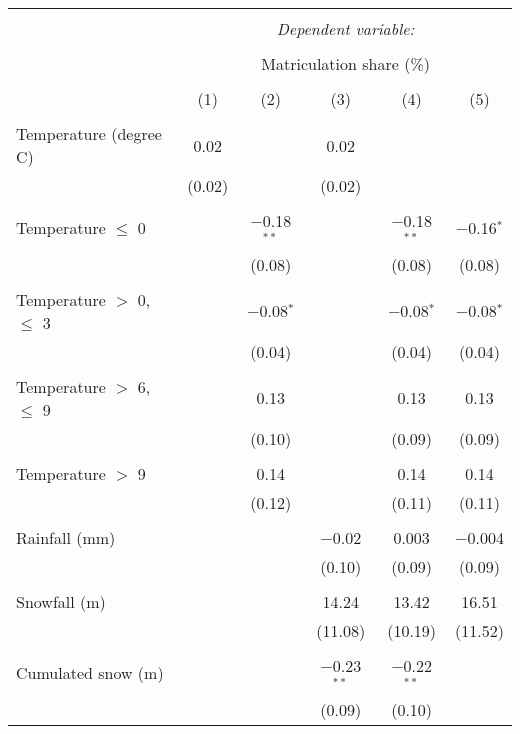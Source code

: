 
\begin{tabular}{@{\extracolsep{5pt}}lccccc} 
\\[-1.8ex]\hline 
\hline \\[-1.8ex] 
 & \multicolumn{5}{c}{\textit{Dependent variable:}} \\ 
\cline{2-6} 
\\[-1.8ex] & \multicolumn{5}{c}{Matriculation share (\%)} \\ 
\\[-1.8ex] & (1) & (2) & (3) & (4) & (5)\\ 
\hline \\[-1.8ex] 
 Temperature (degree C) & 0.02 &  & 0.02 &  &  \\ 
  & (0.02) &  & (0.02) &  &  \\ 
  & & & & & \\ 
 Temperature $\le$ 0 &  & $-$0.18$^{**}$ &  & $-$0.18$^{**}$ & $-$0.16$^{*}$ \\ 
  &  & (0.08) &  & (0.08) & (0.08) \\ 
  & & & & & \\ 
 Temperature $>$ 0, $\le$ 3 &  & $-$0.08$^{*}$ &  & $-$0.08$^{*}$ & $-$0.08$^{*}$ \\ 
  &  & (0.04) &  & (0.04) & (0.04) \\ 
  & & & & & \\ 
 Temperature $>$ 6, $\le$ 9 &  & 0.13 &  & 0.13 & 0.13 \\ 
  &  & (0.10) &  & (0.09) & (0.09) \\ 
  & & & & & \\ 
 Temperature $>$ 9 &  & 0.14 &  & 0.14 & 0.14 \\ 
  &  & (0.12) &  & (0.11) & (0.11) \\ 
  & & & & & \\ 
 Rainfall (mm) &  &  & $-$0.02 & 0.003 & $-$0.004 \\ 
  &  &  & (0.10) & (0.09) & (0.09) \\ 
  & & & & & \\ 
 Snowfall (m) &  &  & 14.24 & 13.42 & 16.51 \\ 
  &  &  & (11.08) & (10.19) & (11.52) \\ 
  & & & & & \\ 
 Cumulated snow (m) &  &  & $-$0.23$^{**}$ & $-$0.22$^{**}$ &  \\ 
  &  &  & (0.09) & (0.10) &  \\ 

\end{tabular}
